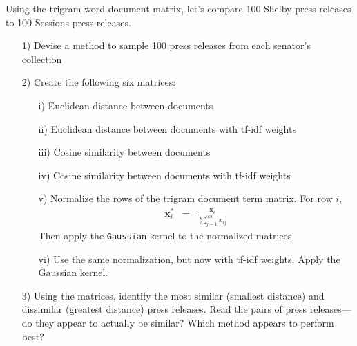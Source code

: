 \documentclass[12pt,letterpaper]{article}
\begin{document}
Using the trigram word document matrix, let's compare 100 Shelby press releases to 100 Sessions press releases.
\begin{itemize}
\item[1)] Devise a method to sample 100 press releases from each senator's collection
\item[2)] Create the following six matrices:
\begin{itemize}
\item[i)] Euclidean distance between documents
\item[ii)] Euclidean distance between documents with tf-idf weights
\item[iii)] Cosine similarity between documents
\item[iv)] Cosine similarity between documents with tf-idf weights
\item[v)] Normalize the rows of the trigram document term matrix.  For row $i$, 
\begin{eqnarray}
\boldsymbol{x}_{i}^{*} & = & \frac{\boldsymbol{x}_{i}}{\sum_{j=1}^{500} x_{ij}} \nonumber 
\end{eqnarray}
Then apply the {\tt Gaussian} kernel to the normalized matrices
\item[vi)] Use the same normalization, but now with tf-idf weights.  Apply the Gaussian kernel.   
\end{itemize}
\item[3)] Using the matrices, identify the most similar (smallest distance) and dissimilar (greatest distance) press releases.  Read the pairs of press releases---do they appear to actually be similar?  Which method appears to perform best?
\end{itemize}
\end{document}
